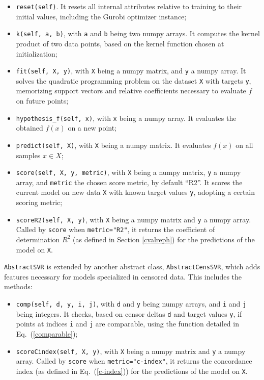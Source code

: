 \documentclass[12pt]{report}
\begin{document}
\begin{itemize}
\item \texttt{reset(self)}. It resets all internal attributes relative to training to their initial values, including the Gurobi optimizer instance;
\item \texttt{k(self, a, b)}, with \texttt{a} and \texttt{b} being two numpy arrays. It computes the kernel product of two data points, based on the kernel function chosen at initialization;
\item \texttt{fit(self, X, y)}, with \texttt{X} being a numpy matrix, and \texttt{y} a numpy array. It solves the quadratic programming problem on the dataset \texttt{X} with targets \texttt{y}, memorizing support vectors and relative coefficients necessary to evaluate $f$ on future points;
\item \texttt{hypothesis\_f(self, x)}, with \texttt{x} being a numpy array. It evaluates the obtained $f(x)$ on a new point;
\item \texttt{predict(self, X)}, with \texttt{X} being a numpy matrix. It evaluates $f(x)$ on all samples $x \in X$;
\item \texttt{score(self, X, y, metric)}, with \texttt{X} being a numpy matrix, \texttt{y} a numpy array, and \texttt{metric} the chosen score metric, by default ``R2''. It scores the current model on new data \texttt{X} with known target values \texttt{y}, adopting a certain scoring metric;
\item \texttt{scoreR2(self, X, y)}, with \texttt{X} being a numpy matrix and \texttt{y} a numpy array. Called by \texttt{score} when \texttt{metric="R2"}, it returns the coefficient of determination $R^2$ (as defined in Section \ref{cvalreph}) for the predictions of the model on \texttt{X}.
\end{itemize}
\texttt{AbstractSVR} is extended by another abstract class, \texttt{AbstractCensSVR}, which adds features necessary for models specialized in censored data. This includes the methods:
\begin{itemize}
\item \texttt{comp(self, d, y, i, j)}, with \texttt{d} and \texttt{y} being numpy arrays, and \texttt{i} and \texttt{j} being integers. It checks, based on censor deltas \texttt{d} and target values \texttt{y}, if points at indices \texttt{i} and \texttt{j} are comparable, using the function detailed in Eq.\ (\ref{comparable});
\item \texttt{scoreCindex(self, X, y)}, with \texttt{X} being a numpy matrix and \texttt{y} a numpy array. Called by \texttt{score} when \texttt{metric="c-index"}, it returns the concordance index (as defined in Eq.\ (\ref{c-index})) for the predictions of the model on \texttt{X}.
\end{itemize}
\end{document}
